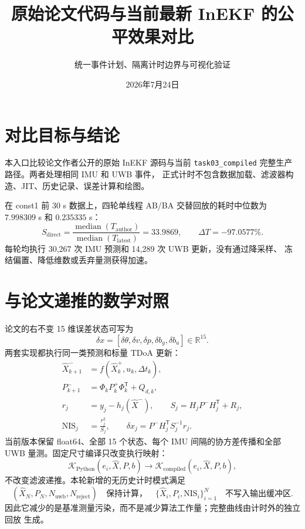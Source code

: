 \documentclass[11pt,a4paper]{ctexart}
\title{原始论文代码与当前最新 InEKF 的公平效果对比}
\author{统一事件计划、隔离计时边界与可视化验证}
\date{2026年7月24日}
\begin{document}
\maketitle

\section{对比目标与结论}

本入口比较论文作者公开的原始 InEKF 源码与当前
\texttt{task03\_compiled} 完整生产路径。两者处理相同 IMU 和 UWB 事件，
正式计时不包含数据加载、滤波器构造、JIT、历史记录、误差计算和绘图。

在 const1 前 30 s 数据上，四轮单线程 AB/BA 交替回放的耗时中位数为
$7.998309$ s 和 $0.235335$ s：
\begin{equation}
 \boxed{
 S_{\mathrm{direct}}
 =\frac{\operatorname{median}(T_{\mathrm{author}})}
 {\operatorname{median}(T_{\mathrm{latest}})}
 =33.9869
 },\qquad
 \Delta T=-97.0577\%.
\end{equation}
每轮均执行 30,267 次 IMU 预测和 14,289 次 UWB 更新，没有通过降采样、
冻结偏置、降低维数或丢弃量测获得加速。

\section{与论文递推的数学对照}

论文的右不变 15 维误差状态可写为
\begin{equation}
 \delta x=
 [\delta\theta,\delta v,\delta p,\delta b_g,\delta b_a]
 \in\mathbb{R}^{15}.
\end{equation}
两套实现都执行同一类预测和标量 TDoA 更新：
\begin{align}
 \hat X_{k+1}^{-}&=f(\hat X_k^{+},u_k,\Delta t_k),\\
 P_{k+1}^{-}&=\Phi_kP_k^{+}\Phi_k^{\mathsf T}+Q_{d,k},\\
 r_j&=y_j-h_j(\hat X^-),\qquad
 S_j=H_jP^-H_j^{\mathsf T}+R_j,\\
 \mathrm{NIS}_j&=\frac{r_j^2}{S_j},\qquad
 \delta x_j=P^-H_j^{\mathsf T}S_j^{-1}r_j.
\end{align}
当前版本保留 float64、全部 15 个状态、每个 IMU 间隔的协方差传播和全部 UWB
量测。固定尺寸编译只改变执行映射：
\begin{equation}
 \mathcal K_{\mathrm{Python}}
 (e_i,\hat X,P,b)
 \longrightarrow
 \mathcal K_{\mathrm{compiled}}
 (e_i,\hat X,P,b),
\end{equation}
不改变滤波递推。本轮新增的无历史计时模式满足
\begin{equation}
 (\hat X_N,P_N,N_{\mathrm{uwb}},N_{\mathrm{reject}})
 \quad\text{保持计算，}\quad
 \{\hat X_i,P_i,\mathrm{NIS}_i\}_{i=1}^{N}\quad\text{不写入输出缓冲区}.
\end{equation}
因此它减少的是基准测量污染，而不是减少算法工作量；完整曲线由计时外的独立回放
生成。
\end{document}
